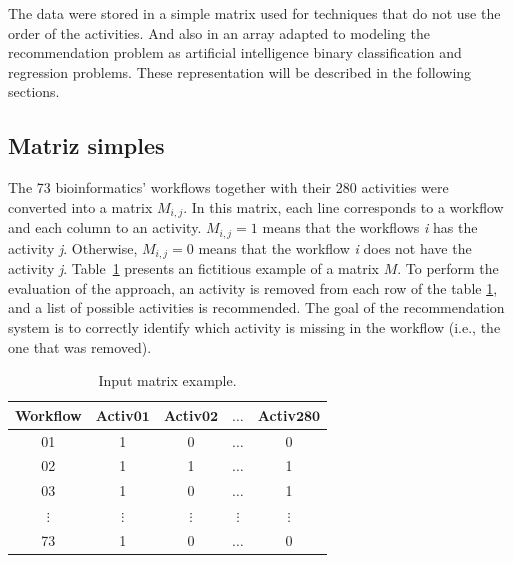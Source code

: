 \documentclass[10pt,letterpaper]{article}
\begin{document}
The data were stored in a simple matrix used for techniques that do not use the order of the activities. And also in an array adapted to modeling the recommendation problem as artificial intelligence binary classification and regression problems. These representation will be described in the following sections.


\subsection*{Matriz simples}
The 73 bioinformatics' workflows together with their 280 activities were converted into a matrix $M_{i, j}$. In this matrix, each line corresponds to a workflow and each column to an activity. $M_{i, j} = 1$ means that the workflows \emph{i} has the activity \emph{j}. Otherwise, $M_{i, j} = 0$ means that the workflow \emph{i} does not have the activity \emph{j}. Table~\ref{tabela_matriz_de_dados} presents an fictitious example of a matrix \(M\). To perform the evaluation of the approach, an activity is removed from each row of the table \ref{tabela_matriz_de_dados}, and a list of possible activities is recommended. The goal of the recommendation system is to correctly identify which activity is missing in the workflow (i.e., the one that was removed).
\begin{table}[htb]
	\centering
	\caption{Input matrix example.}
	\begin{tabular}{|c|c|c|c|c|}  \hline
		\textbf{Workflow} & \textbf{Activ\(\mathbf{01}\)} & \textbf{Activ\(\mathbf{02}\)} & \textbf{\(\mathbf{\ldots}\)} & \textbf{Activ\(\mathbf{280}\)}  \\ \hline
		01 			  & 1 			  & 0 			  & \(\ldots\) 	  & 0  				\\ \hline
		02 			  & 1 			  & 1 			  & \(\ldots\) 	  & 1  				\\ \hline
		03 			  & 1 			  & 0 			  & \(\ldots\) 	  & 1  				\\ \hline
		\(\vdots\) 		  			  & \(\vdots\) 	  & \(\vdots\) 	  & \(\vdots\) 	  & \(\vdots\) 		\\ \hline
		73 			  & 1 			  & 0 			  & \(\ldots\) 	  & 0  				\\ \hline
	\end{tabular}
	\label{tabela_matriz_de_dados}
	\vspace{0.1cm}
\end{table}
\end{document}
